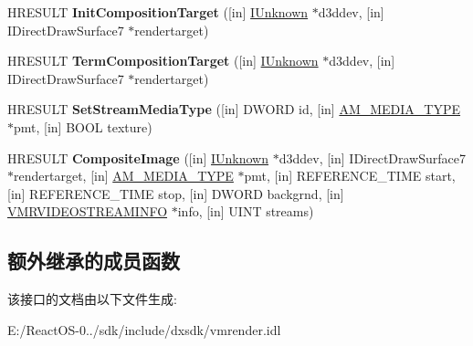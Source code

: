 \begin{DoxyCompactItemize}
\item 
\mbox{\label{interface_i_v_m_r_image_compositor_a70a12a389e832553532e00adae7a0f90}} 
H\+R\+E\+S\+U\+LT {\bfseries Init\+Composition\+Target} (\mbox{[}in\mbox{]} \hyperlink{interface_i_unknown}{I\+Unknown} $\ast$d3ddev, \mbox{[}in\mbox{]} I\+Direct\+Draw\+Surface7 $\ast$rendertarget)
\item 
\mbox{\label{interface_i_v_m_r_image_compositor_af9f5d8972e6f50b151e673b5d4cac0fd}} 
H\+R\+E\+S\+U\+LT {\bfseries Term\+Composition\+Target} (\mbox{[}in\mbox{]} \hyperlink{interface_i_unknown}{I\+Unknown} $\ast$d3ddev, \mbox{[}in\mbox{]} I\+Direct\+Draw\+Surface7 $\ast$rendertarget)
\item 
\mbox{\label{interface_i_v_m_r_image_compositor_aa21f96693043868b91dc177e8f93bff7}} 
H\+R\+E\+S\+U\+LT {\bfseries Set\+Stream\+Media\+Type} (\mbox{[}in\mbox{]} D\+W\+O\+RD id, \mbox{[}in\mbox{]} \hyperlink{struct_a_m___m_e_d_i_a___t_y_p_e}{A\+M\+\_\+\+M\+E\+D\+I\+A\+\_\+\+T\+Y\+PE} $\ast$pmt, \mbox{[}in\mbox{]} B\+O\+OL texture)
\item 
\mbox{\label{interface_i_v_m_r_image_compositor_ae090a6063401c8342bbb58672d5b4bf5}} 
H\+R\+E\+S\+U\+LT {\bfseries Composite\+Image} (\mbox{[}in\mbox{]} \hyperlink{interface_i_unknown}{I\+Unknown} $\ast$d3ddev, \mbox{[}in\mbox{]} I\+Direct\+Draw\+Surface7 $\ast$rendertarget, \mbox{[}in\mbox{]} \hyperlink{struct_a_m___m_e_d_i_a___t_y_p_e}{A\+M\+\_\+\+M\+E\+D\+I\+A\+\_\+\+T\+Y\+PE} $\ast$pmt, \mbox{[}in\mbox{]} R\+E\+F\+E\+R\+E\+N\+C\+E\+\_\+\+T\+I\+ME start, \mbox{[}in\mbox{]} R\+E\+F\+E\+R\+E\+N\+C\+E\+\_\+\+T\+I\+ME stop, \mbox{[}in\mbox{]} D\+W\+O\+RD backgrnd, \mbox{[}in\mbox{]} \hyperlink{struct___v_m_r_v_i_d_e_o_s_t_r_e_a_m_i_n_f_o}{V\+M\+R\+V\+I\+D\+E\+O\+S\+T\+R\+E\+A\+M\+I\+N\+FO} $\ast$info, \mbox{[}in\mbox{]} U\+I\+NT streams)
\end{DoxyCompactItemize}
\subsection*{额外继承的成员函数}


该接口的文档由以下文件生成\+:\begin{DoxyCompactItemize}
\item 
E\+:/\+React\+O\+S-\/0../sdk/include/dxsdk/vmrender.\+idl\end{DoxyCompactItemize}
